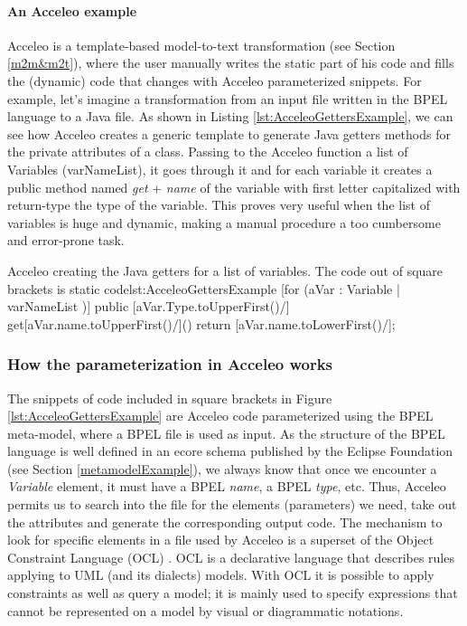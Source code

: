 \paragraph{An Acceleo example}
Acceleo is a template-based model-to-text transformation (see Section \ref{m2m&m2t}), where the user manually writes the static part of his code and fills the (dynamic) code that changes with Acceleo parameterized snippets.
For example, let's imagine a transformation from an input file written in the BPEL language to a Java file. As shown in Listing \ref{lst:AcceleoGettersExample}, we can see how Acceleo creates a generic template to generate Java getters methods for the private attributes of a class. Passing to the Acceleo function a list of Variables (varNameList), it goes through it and for each variable it creates a public method named \textit{get} + \textit{name} of the variable with first letter capitalized with return-type the type of the variable. This proves very useful when the list of variables is huge and dynamic, making a manual procedure a too cumbersome and error-prone task.

\begin{workflow-code}{Acceleo creating the Java getters for a list of variables. The code out of square brackets is static code}{lst:AcceleoGettersExample}
[for (aVar : Variable | varNameList )]
public [aVar.Type.toUpperFirst()/] get[aVar.name.toUpperFirst()/]() {
	return [aVar.name.toLowerFirst()/];
}
\end{workflow-code}

\subsubsection{How the parameterization in Acceleo works}
\label{AcceleoParametirazion}
The snippets of code included in square brackets in Figure \ref{lst:AcceleoGettersExample} are Acceleo code parameterized using the BPEL meta-model, where a BPEL file is used as input. As the structure of the BPEL language is well defined in an ecore schema published by the Eclipse Foundation (see Section \ref{metamodelExample}), we always know that once we encounter a \textit{Variable} element, it must have a BPEL \textit{name}, a BPEL \textit{type}, etc. 
Thus, Acceleo permits us to search into the file for the elements (parameters) we need, take out the attributes and generate the corresponding output code.
The mechanism to look for specific elements in a file used by Acceleo is a superset of the Object Constraint Language (OCL) \cite{UML20OCL}. OCL is a declarative language that describes rules applying to UML (and its dialects) models. With OCL it is possible to apply constraints as well as query a model; it is mainly used to specify expressions that cannot be represented on a model by visual or diagrammatic notations.

